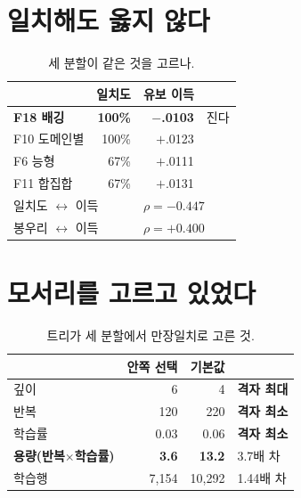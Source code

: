 \documentclass[10pt]{article}
\begin{document}

\section{일치해도 옳지 않다}

\begin{table}[t]
\centering\tsize
\caption{세 분할이 같은 것을 고르나.}
\begin{tabular}{lrrl}
\toprule
& 일치도 & 유보 이득 & \\
\midrule
\textbf{F18 배깅} & \textbf{100\%} & \textbf{$-$.0103} & 진다 \\
F10 도메인별 & 100\% & $+$.0123 & \\
F6 능형 & 67\% & $+$.0111 & \\
F11 합집합 & 67\% & $+$.0131 & \\
\midrule
\multicolumn{2}{l}{일치도 $\leftrightarrow$ 이득} & \multicolumn{2}{l}{$\rho{=}-0.447$} \\
\multicolumn{2}{l}{봉우리 $\leftrightarrow$ 이득} & \multicolumn{2}{l}{$\rho{=}+0.400$} \\
\bottomrule
\end{tabular}
\end{table}


\section{모서리를 고르고 있었다}

\begin{table}[t]
\centering\tsize
\caption{트리가 세 분할에서 만장일치로 고른 것.}
\begin{tabular}{lrrl}
\toprule
& 안쪽 선택 & 기본값 & \\
\midrule
깊이 & 6 & 4 & \textbf{격자 최대} \\
반복 & 120 & 220 & \textbf{격자 최소} \\
학습률 & 0.03 & 0.06 & \textbf{격자 최소} \\
\midrule
\textbf{용량(반복$\times$학습률)} & \textbf{3.6} & \textbf{13.2} & 3.7배 차 \\
학습행 & 7{,}154 & 10{,}292 & 1.44배 차 \\
\bottomrule
\end{tabular}
\end{table}
\end{document}

